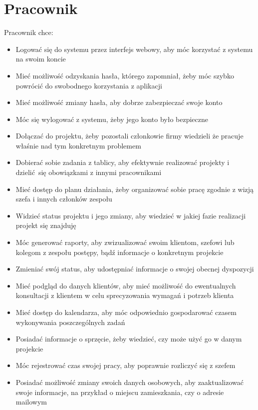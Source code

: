 \documentclass{article}
\begin{document}
\newpage
\section{Pracownik}
Pracownik chce:
\begin{itemize}
    \item Logować się do systemu przez interfejs webowy, aby móc korzystać z systemu na swoim koncie
    \item Mieć możliwość odzyskania hasła, którego zapomniał, żeby móc szybko powrócić do swobodnego korzystania z aplikacji
    \item Mieć możliwość zmiany hasła, aby dobrze zabezpieczać swoje konto
    \item Móc się wylogować z systemu, żeby jego konto było bezpieczne
    \item Dołączać do projektu, żeby pozostali członkowie firmy wiedzieli że pracuje właśnie nad tym konkretnym problemem
    \item Dobierać sobie zadania z tablicy, aby efektywnie realizować projekty i dzielić się obowiązkami z innymi pracownikami
    \item Mieć dostęp do planu działania, żeby organizować sobie pracę zgodnie z wizją szefa i innych członków zespołu
    \item Widzieć status projektu i jego zmiany, aby wiedzieć w jakiej fazie realizacji projekt się znajduję
    \item Móc generować raporty, aby zwizualizować swoim klientom, szefowi lub kolegom z zespołu postępy, bądź informacje o konkretnym projekcie
    \item Zmieniać swój status, aby udostępniać informacje o swojej obecnej dyspozycji
    \item Mieć podgląd do danych klientów, aby mieć możliwość do ewentualnych konsultacji z klientem w celu sprecyzowania wymagań i potrzeb klienta
    \item Mieć dostęp do kalendarza, aby móc odpowiednio gospodarować czasem wykonywania poszczególnych zadań
    \item Posiadać informacje o sprzęcie, żeby wiedzieć, czy może użyć go w danym projekcie
    \item Móc rejestrować czas swojej pracy, aby poprawnie rozliczyć się z szefem
    \item Posiadać możliwość zmiany swoich danych osobowych, aby zaaktualizować swoje informacje, na przykład o miejscu zamieszkania, czy o adresie mailowym
\end{itemize}
\end{document}
